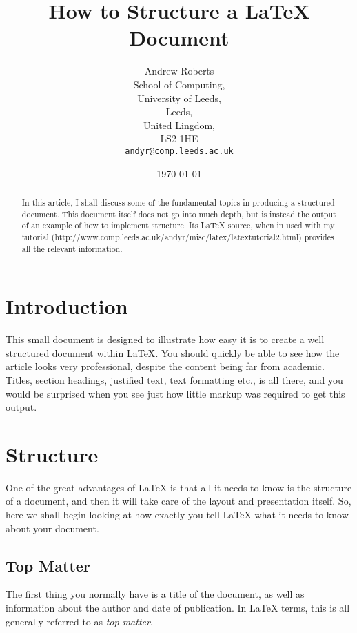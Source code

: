 \documentclass{article}
\begin{document}
\title{How to Structure a \LaTeX{} Document} %
\author{Andrew Roberts\\
	 School of Computing,\\
	 	University of Leeds,\\
	 	Leeds,\\
	 	United Lingdom,\\
	 	LS2 1HE\\
	 	\texttt{andyr@comp.leeds.ac.uk}} %
\date{\today}
\maketitle

\begin{abstract}
In this article, I shall discuss some of the fundamental topics in
producing a structured document.  This document itself does not go into
much depth, but is instead the output of an example of how to implement
structure. Its \LaTeX{} source, when in used with my tutorial
(http://www.comp.leeds.ac.uk/andyr/misc/latex/\-latextutorial2.html)
provides all the relevant information.
\end{abstract}

\section{Introduction}
This small document is designed to illustrate how easy it is to create a
well structured document within \LaTeX\cite{lamport94}.  You should quickly be able to
see how the article looks very professional, despite the content being
far from academic.  Titles, section headings, justified text, text
formatting etc., is all there, and you would be surprised when you see
just how little markup was required to get this output.

\section{Structure}
One of the great advantages of \LaTeX{} is that all it needs to know is
the structure of a document, and then it will take care of the layout
and presentation itself.  So, here we shall begin looking at how exactly
you tell \LaTeX{} what it needs to know about your document.

\subsection{Top Matter}
The first thing you normally have is a title of the document, as well as
information about the author and date of publication.  In \LaTeX{} terms,
this is all generally referred to as \emph{top matter}.
\end{document}

